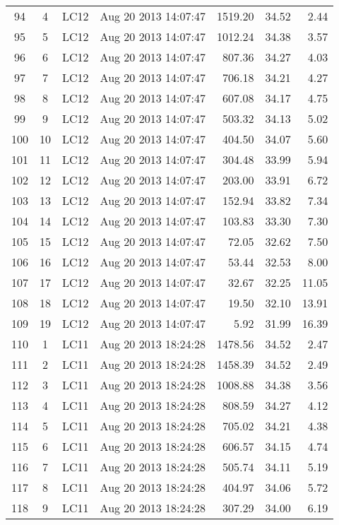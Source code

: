 \documentclass{article}
\begin{document}
\begin{longtable}{ccllrrr}
94 & 4 & LC12 & Aug 20 2013 14:07:47 & 1519.20 & 34.52 & 2.44 \\
95 & 5 & LC12 & Aug 20 2013 14:07:47 & 1012.24 & 34.38 & 3.57 \\
96 & 6 & LC12 & Aug 20 2013 14:07:47 & 807.36 & 34.27 & 4.03 \\
97 & 7 & LC12 & Aug 20 2013 14:07:47 & 706.18 & 34.21 & 4.27 \\
98 & 8 & LC12 & Aug 20 2013 14:07:47 & 607.08 & 34.17 & 4.75 \\
99 & 9 & LC12 & Aug 20 2013 14:07:47 & 503.32 & 34.13 & 5.02 \\
100 & 10 & LC12 & Aug 20 2013 14:07:47 & 404.50 & 34.07 & 5.60 \\
101 & 11 & LC12 & Aug 20 2013 14:07:47 & 304.48 & 33.99 & 5.94 \\
102 & 12 & LC12 & Aug 20 2013 14:07:47 & 203.00 & 33.91 & 6.72 \\
103 & 13 & LC12 & Aug 20 2013 14:07:47 & 152.94 & 33.82 & 7.34 \\
104 & 14 & LC12 & Aug 20 2013 14:07:47 & 103.83 & 33.30 & 7.30 \\
105 & 15 & LC12 & Aug 20 2013 14:07:47 & 72.05 & 32.62 & 7.50 \\
106 & 16 & LC12 & Aug 20 2013 14:07:47 & 53.44 & 32.53 & 8.00 \\
107 & 17 & LC12 & Aug 20 2013 14:07:47 & 32.67 & 32.25 & 11.05 \\
108 & 18 & LC12 & Aug 20 2013 14:07:47 & 19.50 & 32.10 & 13.91 \\
109 & 19 & LC12 & Aug 20 2013 14:07:47 & 5.92 & 31.99 & 16.39 \\
\hline
110 & 1 & LC11 & Aug 20 2013 18:24:28 & 1478.56 & 34.52 & 2.47 \\
111 & 2 & LC11 & Aug 20 2013 18:24:28 & 1458.39 & 34.52 & 2.49 \\
112 & 3 & LC11 & Aug 20 2013 18:24:28 & 1008.88 & 34.38 & 3.56 \\
113 & 4 & LC11 & Aug 20 2013 18:24:28 & 808.59 & 34.27 & 4.12 \\
114 & 5 & LC11 & Aug 20 2013 18:24:28 & 705.02 & 34.21 & 4.38 \\
115 & 6 & LC11 & Aug 20 2013 18:24:28 & 606.57 & 34.15 & 4.74 \\
116 & 7 & LC11 & Aug 20 2013 18:24:28 & 505.74 & 34.11 & 5.19 \\
117 & 8 & LC11 & Aug 20 2013 18:24:28 & 404.97 & 34.06 & 5.72 \\
118 & 9 & LC11 & Aug 20 2013 18:24:28 & 307.29 & 34.00 & 6.19 \\

\end{longtable}
\end{document}
